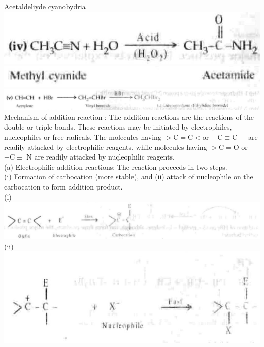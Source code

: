\documentclass[10pt]{article}
\begin{document}
Acetaldeliyde cyanobydria\\
\includegraphics[max width=\textwidth, center]{2025_01_28_8470952b98110cec3aabg-095(4)}\\
\includegraphics[max width=\textwidth, center]{2025_01_28_8470952b98110cec3aabg-095(3)}\\
\includegraphics[max width=\textwidth, center]{2025_01_28_8470952b98110cec3aabg-095(5)}\\
Mechanism of addition reaction : The addition reactions are the reactions of the double or triple bonds. These reactions may be initiated by electrophiles, nucleophiles or free radicals. The molecules having $>\mathrm{C}=\mathrm{C}<\mathrm{or}-\mathrm{C} \equiv \mathrm{C}-$ are readily attacked by electrophilic reagents, while molecules having $>\mathrm{C}=\mathrm{O}$ or $-\mathrm{C} \equiv$ N are readily attacked by nuçleophilic reagents.\\
(a) Electrophilic addition reactions: The reaction proceeds in two steps.\\
(i) Formation of carbocation (more stable), and (ii) attack of nucleophile on the carbocation to form addition product.\\
(i)\\
\includegraphics[max width=\textwidth, center]{2025_01_28_8470952b98110cec3aabg-095(7)}\\
(ii)\\
\includegraphics[max width=\textwidth, center]{2025_01_28_8470952b98110cec3aabg-095}
\end{document}
